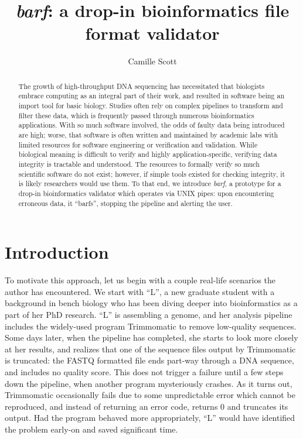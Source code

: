 \documentclass[12pt]{article} %
\title{\textit{barf}: a drop-in bioinformatics file format validator}
\author{Camille Scott}
\newcommand{\quotes}[1]{``#1''}
\begin{document}
\maketitle

\begin{abstract}
The growth of high-throughput DNA sequencing has necessitated that biologists 
embrace computing as an integral part of their work, and resulted in software being
an import tool for basic biology. Studies often rely on
complex pipelines to transform and filter these data, which is frequently passed through
numerous bioinformatics applications. With so much software involved, the odds
of faulty data being introduced are high; worse, that software is often written and
maintained by academic labs with limited resources for software engineering
or verification and validation. While biological meaning is difficult to verify and highly application-specific, verifying
data integrity is tractable and understood. The resources
to formally verify so much scientific software do not exist; however, if simple
tools existed for checking integrity, it is likely researchers would use them. To that end,
we introduce \emph{barf}, a prototype for a drop-in bioinformatics validator which
operates via UNIX pipes: upon encountering erroneous data, it \quotes{barfs}, 
stopping the pipeline and alerting the user. 
\end{abstract}

\section{Introduction}

To motivate this approach, let us begin with a couple real-life scenarios the author
has encountered. We start with \quotes{L}, a new graduate student with a background
in bench biology who has been diving deeper into bioinformatics as a part of her
PhD research. \quotes{L} is assembling a genome, and her analysis pipeline includes
the widely-used program Trimmomatic \citep{bolger_trimmomatic:_2014} to remove
low-quality sequences. Some days later, when the pipeline has completed, she starts
to look more closely at her results, and realizes that one of the sequence files output
by Trimmomatic is truncated: the FASTQ formatted file ends part-way through a 
DNA sequence, and includes no quality score. This does not trigger a failure until
a few steps down the pipeline, when another program mysteriously crashes. As it turns
out, Trimmomatic occasionally fails due to some unpredictable error which cannot be
reproduced, and instead of returning an error code, returns $0$ and truncates
its output. Had the program behaved more appropriately, \quotes{L} would have
identified the problem early-on and saved significant time.
\end{document}
